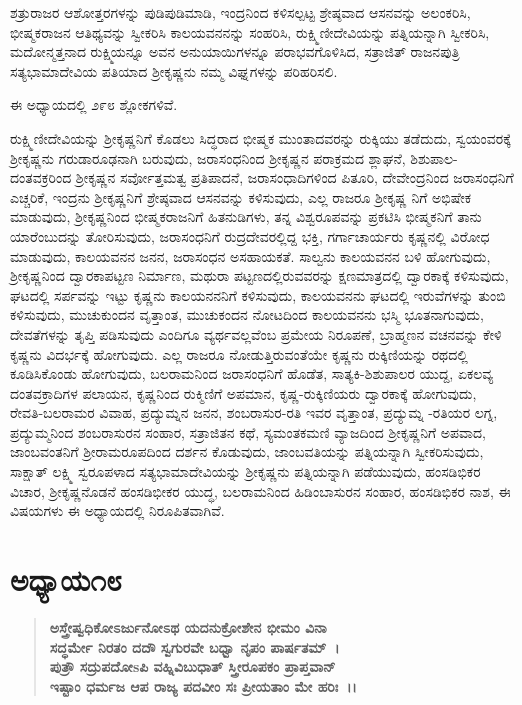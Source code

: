 ಶತ್ರುರಾಜರ ಆಶೋತ್ತರಗಳನ್ನು ಪುಡಿಪುಡಿಮಾಡಿ, ಇಂದ್ರನಿಂದ ಕಳಿಸಲ್ಪಟ್ಟ ಶ್ರೇಷ್ಠವಾದ ಆಸನವನ್ನು ಅಲಂಕರಿಸಿ, ಭೀಷ್ಮಕರಾಜನ ಆತಿಥ್ಯವನ್ನು ಸ್ವೀಕರಿಸಿ ಕಾಲಯವನನನ್ನು ಸಂಹರಿಸಿ, ರುಕ್ಷ್ಮಿಣೀದೇವಿಯನ್ನು ಪತ್ನಿಯನ್ನಾಗಿ ಸ್ವೀಕರಿಸಿ, ಮದೋನ್ಮತ್ತನಾದ ರುಕ್ಷ್ಮಿಯನ್ನೂ ಅವನ ಅನುಯಾಯಿಗಳನ್ನೂ ಪರಾಭವಗೊಳಿಸಿದ, ಸತ್ರಾಜಿತ್ ರಾಜನಪುತ್ರಿ ಸತ್ಯಭಾಮಾದೇವಿಯ ಪತಿಯಾದ ಶ‍್ರೀಕೃಷ್ಣನು ನಮ್ಮ ವಿಘ್ನಗಳನ್ನು ಪರಿಹರಿಸಲಿ.

ಈ ಅಧ್ಯಾಯದಲ್ಲಿ ೨೯೮ ಶ್ಲೋಕಗಳಿವೆ.

ರುಕ್ಷ್ಮಿಣೀದೇವಿಯನ್ನು ಶ‍್ರೀಕೃಷ್ಣನಿಗೆ ಕೊಡಲು ಸಿದ್ಧರಾದ ಭೀಷ್ಮಕ ಮುಂತಾದವರನ್ನು ರುಕ್ಕಿಯು ತಡೆದುದು, ಸ್ವಯಂವರಕ್ಕೆ ಶ‍್ರೀಕೃಷ್ಣನು ಗರುಡಾರೂಢನಾಗಿ ಬರುವುದು, ಜರಾಸಂಧನಿಂದ ಶ‍್ರೀಕೃಷ್ಣನ ಪರಾಕ್ರಮದ ಶ್ಲಾಘನೆ, ಶಿಶುಪಾಲ-ದಂತವಕ್ರರಿಂದ ಶ‍್ರೀಕೃಷ್ಣನ ಸರ್ವೋತ್ತಮತ್ವ ಪ್ರತಿಪಾದನೆ, ಜರಾಸಂಧಾದಿಗಳಿಂದ ಪಿತೂರಿ, ದೇವೇಂದ್ರನಿಂದ ಜರಾಸಂಧನಿಗೆ ಎಚ್ಚರಿಕೆ, ಇಂದ್ರನು ಶ‍್ರೀಕೃಷ್ಣನಿಗೆ ಶ್ರೇಷ್ಠವಾದ ಆಸನವನ್ನು ಕಳಿಸುವುದು, ಎಲ್ಲ ರಾಜರೂ ಶ‍್ರೀಕೃಷ್ಣ ನಿಗೆ ಅಭಿಷೇಕ ಮಾಡುವುದು, ಶ‍್ರೀಕೃಷ್ಣನಿಂದ ಭೀಷ್ಮಕರಾಜನಿಗೆ ಹಿತನುಡಿಗಳು, ತನ್ನ ವಿಶ್ವರೂಪವನ್ನು ಪ್ರಕಟಿಸಿ ಭೀಷ್ಮಕನಿಗೆ ತಾನು ಯಾರೆಂಬುದನ್ನು ತೋರಿಸುವುದು, ಜರಾಸಂಧನಿಗೆ ರುದ್ರದೇವರಲ್ಲಿದ್ದ ಭಕ್ತಿ, ಗರ್ಗಾಚಾರ್ಯರು ಕೃಷ್ಣನಲ್ಲಿ ವಿರೋಧ ಮಾಡುವುದು, ಕಾಲಯವನನ ಜನನ, ಜರಾಸಂಧನ ಅಸಹಾಯಕತೆ. ಸಾಲ್ವನು ಕಾಲಯವನನ ಬಳಿ ಹೋಗುವುದು, ಶ‍್ರೀಕೃಷ್ಣನಿಂದ ದ್ವಾರಕಾಪಟ್ಟಣ ನಿರ್ಮಾಣ, ಮಥುರಾ ಪಟ್ಟಣದಲ್ಲಿರುವವರನ್ನು ಕ್ಷಣಮಾತ್ರದಲ್ಲಿ ದ್ವಾರಕಾಕ್ಕೆ ಕಳಿಸುವುದು, ಘಟದಲ್ಲಿ ಸರ್ಪವನ್ನು ಇಟ್ಟು ಕೃಷ್ಣನು ಕಾಲಯನನನಿಗೆ ಕಳಿಸುವುದು, ಕಾಲಯವನನು ಘಟದಲ್ಲಿ ಇರುವೆಗಳನ್ನು ತುಂಬಿ ಕಳಿಸುವುದು, ಮುಚುಕುಂದನ ವೃತ್ತಾಂತ, ಮುಚುಕಂದನ ನೋಟದಿಂದ ಕಾಲಯವನನು ಭಸ್ಮಿ ಭೂತನಾಗುವುದು, ದೇವತೆಗಳನ್ನು ತೃಪ್ತಿ ಪಡಿಸುವುದು ಎಂದಿಗೂ ವ್ಯರ್ಥವಲ್ಲವೆಂಬ ಪ್ರಮೇಯ ನಿರೂಪಣೆ, ಬ್ರಾಹ್ಮಣನ ವಚನವನ್ನು ಕೇಳಿ ಕೃಷ್ಣನು ವಿದರ್ಭಕ್ಕೆ ಹೋಗುವುದು. ಎಲ್ಲ ರಾಜರೂ ನೋಡುತ್ತಿರುವಂತೆಯೇ ಕೃಷ್ಣನು ರುಕ್ಕಿಣಿಯನ್ನು ರಥದಲ್ಲಿ ಕೂಡಿಸಿಕೊಂಡು ಹೋಗುವುದು, ಬಲರಾಮನಿಂದ ಜರಾಸಂಧನಿಗೆ ಹೊಡೆತ, ಸಾತ್ಯಕಿ-ಶಿಶುಪಾಲರ ಯುದ್ದ, ಏಕಲವ್ಯ ದಂತವಕ್ರಾದಿಗಳ ಪಲಾಯನ, ಕೃಷ್ಣನಿಂದ ರುಕ್ಮಿಣಿಗೆ ಅಪಮಾನ, ಕೃಷ್ಣ-\-ರುಕ್ಕಿಣಿಯರು ದ್ವಾರಕಾಕ್ಕೆ ಹೋಗುವುದು, ರೇವತಿ-ಬಲರಾಮರ ವಿವಾಹ, ಪ್ರದ್ಯುಮ್ನನ ಜನನ, ಶಂಬರಾಸುರ-ರತಿ ಇವರ ವೃತ್ತಾಂತ, ಪ್ರದ್ಯುಮ್ನ -ರತಿಯರ ಲಗ್ನ, ಪ್ರದ್ಯುಮ್ಮನಿಂದ ಶಂಬರಾಸುರನ ಸಂಹಾರ, ಸತ್ರಾಜಿತನ ಕಥೆ, ಸ್ಯಮಂತಕಮಣಿ ವ್ಯಾಜದಿಂದ ಶ‍್ರೀಕೃಷ್ಣನಿಗೆ ಅಪವಾದ, ಜಾಂಬವಂತನಿಗೆ ಶ‍್ರೀರಾಮರೂಪದಿಂದ ದರ್ಶನ ಕೊಡುವುದು, ಜಾಂಬವತಿಯನ್ನು ಪತ್ನಿಯನ್ನಾಗಿ ಸ್ವೀಕರಿಸುವುದು, ಸಾಕ್ಷಾತ್ ಲಕ್ಷ್ಮಿ ಸ್ವರೂಪಳಾದ ಸತ್ಯಭಾಮಾದೇವಿಯನ್ನು ಶ‍್ರೀಕೃಷ್ಣನು ಪತ್ನಿಯನ್ನಾಗಿ ಪಡೆಯುವುದು, ಹಂಸಡಿಭಿಕರ ವಿಚಾರ, ಶ‍್ರೀಕೃಷ್ಣನೊಡನೆ ಹಂಸಡಿಭೀಕರ ಯುದ್ಧ, ಬಲರಾಮನಿಂದ ಹಿಡಿಂಬಾಸುರನ ಸಂಹಾರ, ಹಂಸಡಿಭಿಕರ ನಾಶ, ಈ ವಿಷಯಗಳು ಈ ಅಧ್ಯಾಯದಲ್ಲಿ ನಿರೂಪಿತವಾಗಿವೆ.

\vspace{-.12cm}

\section*{ಅಧ್ಯಾಯ\enginline{-}೧೮}

\begin{verse}
\textbf{ಅಸ್ತ್ರೇಷ್ವಧಿಕೋಽರ್ಜುನೋಽಥ ಯದನುಕ್ರೋಶೇನ ಭೀಮಂ ವಿನಾ}\\\textbf{ಸದ್ಧರ್ಮೇ ನಿರತಂ ದದೌ ಸ್ವಗುರವೇ ಬಧ್ವಾ ನೃಪಂ ಪಾರ್ಷತಮ್~।}\\\textbf{ಪುತ್ರೌ ಸದ್ರುಪದೋsಪಿ ವಹ್ನಿವಿಬುಧಾತ್ ಸ್ತ್ರೀರೂಪಕಂ ಪ್ರಾಪ್ತವಾನ್}\\\textbf{ಇಷ್ಟಾಂ ಧರ್ಮಜ ಆಪ ರಾಜ್ಯ ಪದವೀಂ ಸಃ ಪ್ರೀಯತಾಂ ಮೇ ಹರಿಃ~।।}
\end{verse}

